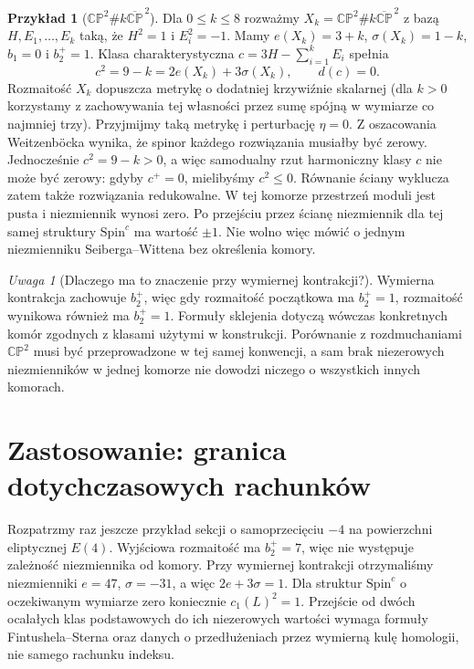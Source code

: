 \documentclass[11pt,a4paper]{report}
\numberwithin{equation}{section}
\theoremstyle{plain}
\theoremstyle{definition}
\newtheorem{przyklad}[twierdzenie]{Przykład}
\theoremstyle{remark}
\newtheorem{uwaga}[twierdzenie]{Uwaga}
\begin{document}
\begin{przyklad}[\texorpdfstring{$\mathbb{CP}^2\#k\overline{\mathbb{CP}}^{\,2}$}{CP2}]
Dla $0\leq k\leq8$ rozważmy
$X_k=\mathbb{CP}^2\#k\overline{\mathbb{CP}}^{\,2}$
z bazą $H,E_1,\ldots,E_k$ taką, że $H^2=1$ i $E_i^2=-1$.
Mamy $e(X_k)=3+k$, $\sigma(X_k)=1-k$, $b_1=0$ i $b_2^+=1$.
Klasa charakterystyczna $c=3H-\sum_{i=1}^kE_i$ spełnia
\[
c^2=9-k=2e(X_k)+3\sigma(X_k),\qquad d(c)=0.
\]
Rozmaitość $X_k$ dopuszcza metrykę o dodatniej krzywiźnie
skalarnej (dla $k>0$ korzystamy z zachowywania tej własności
przez sumę spójną w wymiarze co najmniej trzy).
Przyjmijmy taką metrykę i perturbację $\eta=0$.
Z oszacowania Weitzenböcka wynika, że spinor każdego
rozwiązania musiałby być zerowy. Jednocześnie $c^2=9-k>0$,
a więc samodualny rzut harmoniczny klasy $c$ nie może
być zerowy: gdyby $c^+=0$, mielibyśmy $c^2\leq0$.
Równanie ściany wyklucza zatem także rozwiązania
redukowalne. W tej komorze przestrzeń moduli jest pusta
i niezmiennik wynosi zero. Po przejściu przez ścianę
niezmiennik dla tej samej struktury $\mathrm{Spin}^c$
ma wartość $\pm1$. Nie wolno więc mówić o jednym
niezmienniku Seiberga--Wittena bez określenia komory.
\end{przyklad}

\begin{uwaga}[Dlaczego ma to znaczenie przy wymiernej kontrakcji?]
Wymierna kontrakcja zachowuje $b_2^+$, więc gdy rozmaitość
początkowa ma $b_2^+=1$, rozmaitość wynikowa również ma
$b_2^+=1$. Formuły sklejenia dotyczą wówczas konkretnych
komór zgodnych z klasami użytymi w konstrukcji.
Porównanie z rozdmuchaniami $\mathbb{CP}^2$ musi być
przeprowadzone w tej samej konwencji, a sam brak niezerowych
niezmienników w jednej komorze nie dowodzi niczego
o wszystkich innych komorach.
\end{uwaga}

\section{Zastosowanie: granica dotychczasowych rachunków}
\label{sec:tg-sw-what-next}

Rozpatrzmy raz jeszcze przykład sekcji o samoprzecięciu
$-4$ na powierzchni eliptycznej $E(4)$. Wyjściowa rozmaitość
ma $b_2^+=7$, więc nie występuje zależność niezmiennika od komory.
Przy wymiernej kontrakcji otrzymaliśmy niezmienniki
$e=47$, $\sigma=-31$, a więc $2e+3\sigma=1$.
Dla struktur $\mathrm{Spin}^c$ o oczekiwanym wymiarze zero
koniecznie $c_1(L)^2=1$. Przejście od dwóch ocalałych
klas podstawowych do ich niezerowych wartości wymaga
formuły Fintushela--Sterna oraz danych o przedłużeniach
przez wymierną kulę homologii, nie samego rachunku indeksu.
\end{document}
